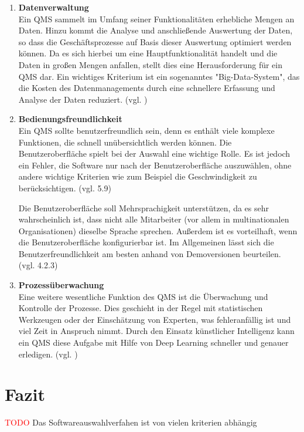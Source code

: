 \documentclass[11pt]{scrartcl}       %
\begin{document}
\begin{enumerate}

\item[] \textbf{Datenverwaltung} \\
Ein QMS sammelt im Umfang seiner Funktionalitäten erhebliche Mengen an Daten. Hinzu kommt die Analyse und anschließende Auswertung der Daten, so dass die Geschäftsprozesse auf Basis dieser Auswertung optimiert werden können. Da es sich hierbei um eine Hauptfunktionalität handelt und die Daten in großen Mengen anfallen, stellt dies eine Herausforderung für ein QMS dar. Ein wichtiges Kriterium ist ein sogenanntes "Big-Data-System", das die Kosten des Datenmanagements durch eine schnellere Erfassung und Analyse der Daten reduziert. (vgl. \cite{alexandrova2020Information})

\item[] \textbf{Bedienungsfreundlichkeit} \\ 
Ein QMS sollte benutzerfreundlich sein, denn es enthält viele komplexe Funktionen, die schnell unübersichtlich werden können. Die Benutzeroberfläche spielt bei der Auswahl eine wichtige Rolle. Es ist jedoch ein Fehler, die Software nur nach der Benutzeroberfläche auszuwählen, ohne andere wichtige Kriterien wie zum Beispiel die Geschwindigkeit zu berücksichtigen. (vgl. \cite{teich2008richtige} 5.9)

Die Benutzeroberfläche soll Mehrsprachigkeit unterstützen, da es sehr wahrscheinlich ist, dass nicht alle Mitarbeiter (vor allem in multinationalen Organisationen) dieselbe Sprache sprechen. Außerdem ist es vorteilhaft, wenn die Benutzeroberfläche konfigurierbar ist. Im Allgemeinen lässt sich die Benutzerfreundlichkeit am besten anhand von Demoversionen beurteilen. (vgl. \cite{pfeifer2021masing} 4.2.3)

\item[] \textbf{Prozessüberwachung} \\
Eine weitere wesentliche Funktion des QMS ist die Überwachung und Kontrolle der Prozesse. Dies geschieht in der Regel mit statistischen Werkzeugen oder der Einschätzung von Experten, was fehleranfällig ist und viel Zeit in Anspruch nimmt. Durch den Einsatz künstlicher Intelligenz kann ein QMS diese Aufgabe mit Hilfe von Deep Learning schneller und genauer erledigen. (vgl. \cite{alexandrova2020Information})
\end{enumerate}


\section{Fazit}

 \textcolor{red}{TODO}
Das Softwareauswahlverfahen ist von vielen kriterien abhängig



\newpage
{}
{}
\printbibliography
\end{document}

